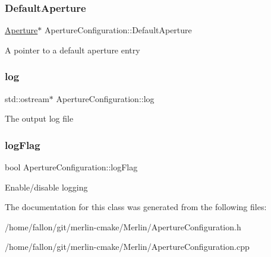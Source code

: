 \subsubsection{\texorpdfstring{Default\+Aperture}{DefaultAperture}}
{\footnotesize\ttfamily \hyperlink{classAperture}{Aperture}$\ast$ Aperture\+Configuration\+::\+Default\+Aperture}

A pointer to a default aperture entry \mbox{\label{classApertureConfiguration_a14da0e53d6b7306ad417dfa51f4d7470}} 
\subsubsection{\texorpdfstring{log}{log}}
{\footnotesize\ttfamily std\+::ostream$\ast$ Aperture\+Configuration\+::log}

The output log file \mbox{\label{classApertureConfiguration_ad4005122e0a206a8376407ed8c54c0f6}} 
\subsubsection{\texorpdfstring{log\+Flag}{logFlag}}
{\footnotesize\ttfamily bool Aperture\+Configuration\+::log\+Flag}

Enable/disable logging 

The documentation for this class was generated from the following files\+:\begin{DoxyCompactItemize}
\item 
/home/fallon/git/merlin-\/cmake/\+Merlin/Aperture\+Configuration.\+h\item 
/home/fallon/git/merlin-\/cmake/\+Merlin/Aperture\+Configuration.\+cpp\end{DoxyCompactItemize}
